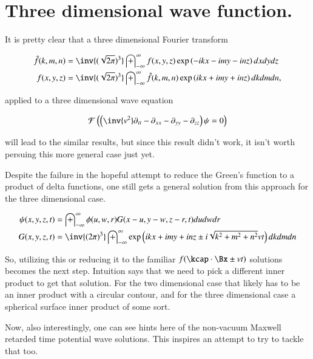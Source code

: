\documentclass{article}
\newcommand{\FF}[0]{\mathcal{F}}
\newcommand{\IIinf}[0]{ \int_{-\infty}^\infty }
\begin{document}
\section{ Three dimensional wave function. }

It is pretty clear that a three dimensional Fourier transform

\begin{align*}
\hat{f}(k,m,n) &= \inv{(\sqrt{2\pi})^3} \IIinf f(x,y,z) \exp\left( -i k x - i m y - i n z \right) dx dy dz \\
{f}(x,y,z) &= \inv{(\sqrt{2\pi})^3} \IIinf \hat{f}(k,m,n) \exp\left( i k x + i m y + i n z \right) dk dm dn,
\end{align*}

applied to a three dimensional wave equation

\begin{align*}
\FF\left( \left(\inv{v^2} \partial_{tt} -\partial_{xx} -\partial_{yy} -\partial_{zz} \right)\psi = 0 \right)
\end{align*}

will lead to the similar results, but since this result didn't work, it isn't worth persuing this more general case just yet.

Despite the failure in the hopeful attempt to reduce the Green's function to a product of delta functions, one still gets a general solution
from this approach for the three dimensional case.

\begin{align}\label{eqn:greensSolution3d}
{\psi}(x,y,z,t) &= \IIinf \phi(u,w,r) G( x-u, y-w, z-r, t) du dw dr \\
G(x,y,z,t) &= \inv{({2\pi})^3} \IIinf \exp\left( i k x + i m y + i n z \pm i \sqrt{k^2 + m^2 + n^2} v t \right) dk dm dn
\end{align}

So, utilizing this or reducing it to the familiar $f(\kcap \cdot \Bx \pm vt)$ solutions becomes the next step.  Intuition says that we
need to pick a different inner product to get that solution.  For the two dimensional case that likely has to be an inner product
with a circular contour, and for the three dimensional case a spherical surface inner product of some sort.

Now, also interestingly, one can see hints here of the non-vacuum Maxwell retarded time potential wave solutions.
This inspires an attempt to try to tackle that too.



\end{document}
